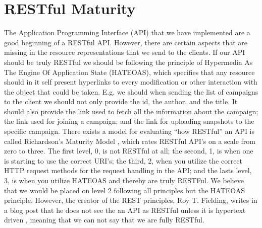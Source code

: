 
\section{RESTful Maturity}
\label{sec:restful_maturity}

The Application Programming Interface (API) that we have implemented are a good beginning of a RESTful API. However, there are certain aspects that are missing in the resource representations that we send to the clients. If our API should be truly RESTful we should be following the principle of Hypermedia As The Engine Of Application State (HATEOAS), which specifies that any resource should in it self present hyperlinks to every modification or other interaction with the object that could be taken. E.g. we should when sending the list of campaigns to the client we should not only provide the id, the author, and the title. It should also provide the link used to fetch all the information about the campaign; the link used for joining a campaign; and the link for uploading snapshots to the specific campaign. There exists a model for evaluating ``how RESTful'' an API is called Richardson's Maturity Model \parencite{richardsons_model}, which rates RESTful API's on a scale from zero to three. The first level, 0, is not RESTful at all; the second, 1, is when one is starting to use the correct URI's; the third, 2, when you utilize the correct HTTP request methods for the request handling in the API; and the lasts level, 3, is when you utilize HATEOAS and thereby are truly RESTFul. We believe that we would be placed on level 2 following all principles but the HATEOAS principle. However, the creator of the REST principles, Roy T. Fielding, writes in a blog post that he does not see the an API as RESTful unless it is hypertext driven , meaning that we can not say that we are fully RESTful. 